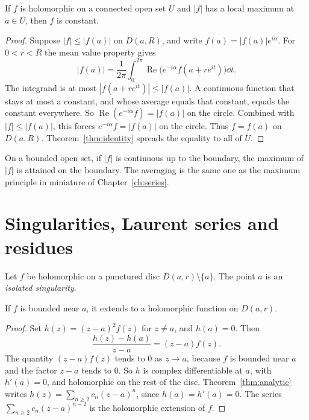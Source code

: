 \begin{theorem}\label{thm:maxprinciple}
If $f$ is holomorphic on a connected open set $U$ and $|f|$ has a local maximum at $a\in U$, then $f$ is constant.
\end{theorem}
\begin{proof}
Suppose $|f|\le|f(a)|$ on $D(a,R)$, and write $f(a)=|f(a)|e^{i\alpha}$. For $0<r<R$ the mean value property gives
\[
|f(a)|=\frac1{2\pi}\int_0^{2\pi}\operatorname{Re}\bigl(e^{-i\alpha}f(a+re^{it})\bigr)\dd t.
\]
The integrand is at most $|f(a+re^{it})|\le|f(a)|$. A continuous function that stays at most a constant, and whose average equals that constant, equals the constant everywhere. So $\operatorname{Re}(e^{-i\alpha}f)=|f(a)|$ on the circle. Combined with $|f|\le|f(a)|$, this forces $e^{-i\alpha}f=|f(a)|$ on the circle. Thus $f=f(a)$ on $D(a,R)$. Theorem~\ref{thm:identity} spreads the equality to all of $U$.
\end{proof}

On a bounded open set, if $|f|$ is continuous up to the boundary, the maximum of $|f|$ is attained on the boundary. The averaging is the same one as the maximum principle in miniature of Chapter~\ref{ch:series}.
\section{Singularities, Laurent series and residues}

Let $f$ be holomorphic on a punctured disc $D(a,r)\setminus\{a\}$. The point $a$ is an \emph{isolated singularity}.

\begin{theorem}\label{thm:removable}
If $f$ is bounded near $a$, it extends to a holomorphic function on $D(a,r)$.
\end{theorem}
\begin{proof}
Set $h(z)=(z-a)^2f(z)$ for $z\ne a$, and $h(a)=0$. Then
\[
\frac{h(z)-h(a)}{z-a}=(z-a)f(z).
\]
The quantity $(z-a)f(z)$ tends to $0$ as $z\to a$, because $f$ is bounded near $a$ and the factor $z-a$ tends to $0$. So $h$ is complex differentiable at $a$, with $h'(a)=0$, and holomorphic on the rest of the disc. Theorem~\ref{thm:analytic} writes $h(z)=\sum_{n\ge2}c_n(z-a)^n$, since $h(a)=h'(a)=0$. The series $\sum_{n\ge2}c_n(z-a)^{n-2}$ is the holomorphic extension of $f$.
\end{proof}

